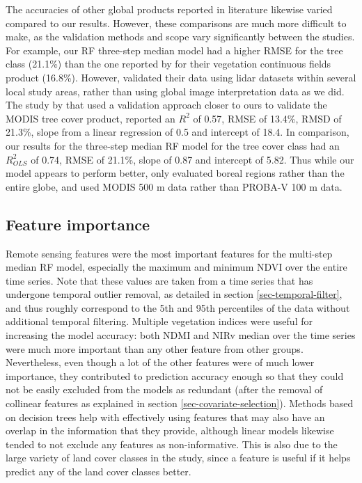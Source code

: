 \documentclass[review,authoryear,3p]{elsarticle}
\begin{document}
The accuracies of other global products reported in literature likewise varied compared to our results.
However, these comparisons are much more difficult to make, as the validation methods and scope vary significantly between the studies.
For example, our \gls{RF} three-step median model had a higher \gls{RMSE} for the tree class (21.1\%) than the one reported by \citet{sexton_global_2013} for their vegetation continuous fields product (16.8\%).
However, \citet{sexton_global_2013} validated their data using lidar datasets within several local study areas, rather than using global image interpretation data as we did.
The study by \citet{montesano_modis_2009} that used a validation approach closer to ours to validate the MODIS tree cover product, reported  an $R^2$ of 0.57, \gls{RMSE} of 13.4\%, RMSD of 21.3\%, slope from a linear regression of 0.5 and intercept of 18.4.
In comparison, our results for the three-step median \gls{RF} model for the tree cover class had an $R^2_{OLS}$ of 0.74, \gls{RMSE} of 21.1\%, slope of 0.87 and intercept of 5.82.
Thus while our model appears to perform better, \citet{montesano_modis_2009} only evaluated boreal regions rather than the entire globe, and used MODIS 500 m data rather than PROBA-V 100 m data.

\subsection{Feature importance}

Remote sensing features were the most important features for the multi-step median \gls{RF} model, especially the maximum and minimum \gls{NDVI} over the entire time series.
Note that these values are taken from a time series that has undergone temporal outlier removal, as detailed in section \ref{sec-temporal-filter}, and thus roughly correspond to the 5th and 95th percentiles of the data without additional temporal filtering.
Multiple vegetation indices were useful for increasing the model accuracy: both \gls{NDMI} and \gls{NIRv} median over the time series were much more important than any other feature from other groups.
Nevertheless, even though a lot of the other features were of much lower importance, they contributed to prediction accuracy enough so that they could not be easily excluded from the models as redundant (after the removal of collinear features as explained in section \ref{sec-covariate-selection}).
Methods based on decision trees help with effectively using features that may also have an overlap in the information that they provide, although linear models likewise tended to not exclude any features as non-informative.
This is also due to the large variety of land cover classes in the study, since a feature is useful if it helps predict any of the land cover classes better.
\end{document}
